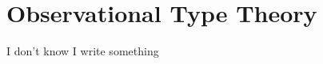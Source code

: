 \setchapterpreamble[u]{\margintoc}
\chapter{Observational Type Theory}



I don't know I write something \MLTT

